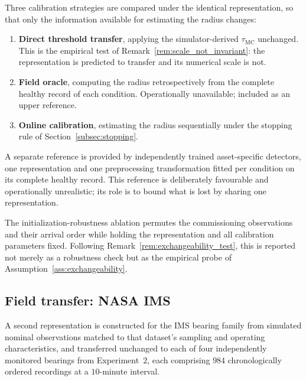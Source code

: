 \documentclass[a4paper]{cas-sc}
\newcommand{\taumc}{\ensuremath{\tau_{\mathrm{MC}}}}
\begin{document}
Three calibration strategies are compared under the identical representation,
so that only the information available for estimating the radius changes:

\begin{enumerate}[leftmargin=1.8em]
\item \textbf{Direct threshold transfer}, applying the simulator-derived
      \(\taumc\) unchanged. This is the empirical test of
      Remark~\ref{rem:scale_not_invariant}: the representation is predicted to
      transfer and its numerical scale is not.
\item \textbf{Field oracle}, computing the radius retrospectively from the
      complete healthy record of each condition. Operationally unavailable;
      included as an upper reference.
\item \textbf{Online calibration}, estimating the radius sequentially under
      the stopping rule of Section~\ref{subsec:stopping}.
\end{enumerate}

A separate reference is provided by independently trained asset-specific
detectors, one representation and one preprocessing transformation fitted per
condition on its complete healthy record. This reference is deliberately
favourable and operationally unrealistic; its role is to bound what is lost by
sharing one representation.

The initialization-robustness ablation permutes the commissioning
observations and their arrival order while holding the representation and all
calibration parameters fixed. Following
Remark~\ref{rem:exchangeability_test}, this is reported not merely as a
robustness check but as the empirical probe of
Assumption~\ref{ass:exchangeability}.

\subsection{Field transfer: NASA IMS}
\label{subsec:design_nasa}

A second representation is constructed for the IMS bearing family from
simulated nominal observations matched to that dataset's sampling and
operating characteristics, and transferred unchanged to each of four
independently monitored bearings from Experiment~2, each comprising \(984\)
chronologically ordered recordings at a \(10\)-minute interval.
\end{document}
